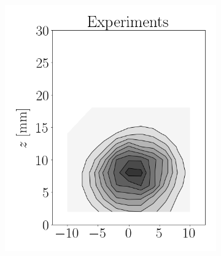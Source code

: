 \begin{figure}[h!]
\flushleft
\begin{subfigure}[b]{0.2\textwidth}
	\flushleft
   \includegraphics[scale=0.4]{./part2_developments/figures_ch6_lagrangian_JICF/params_gaseous_initial_conditions/maps/expe_flux}
\end{subfigure}
\hspace*{0.275in}
\begin{subfigure}[b]{0.2\textwidth}
	\flushleft

\end{subfigure}
\end{figure}
